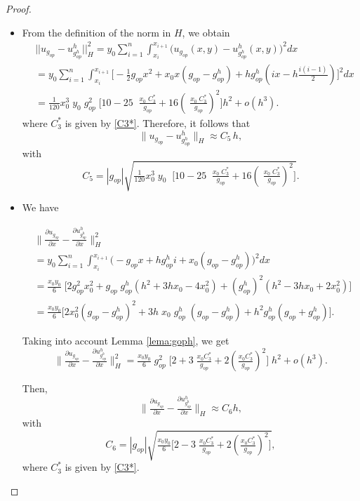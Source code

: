 \documentclass[axioms,article,submit,moreauthors]{Definitions/mdpi}
\newcommand{\dee}{d}
\newcommand{\bint}{\displaystyle\int}
\newcommand\pder[2][]{\ensuremath{\tfrac{\partial#1}{\partial#2}}}
\begin{document}
   \begin{proof}$ $
    \begin{itemize}
     \item[(a)] From the definition of the norm in $H$, we obtain 
      \[\begin{array}{ll}
   &  ||u_{g_{op}}-{u^h_{g^h_{op}}}   ||_{H}^2 =y_0 \displaystyle\sum\limits_{i=1}^n \bint_{x_i}^{x_{i+1}}  \Big(u_{g_{op}}(x,y)-{u^h_{g^h_{op}}}   (x,y)\Big)^2  \dee x\\ 
  & =y_0 \displaystyle\sum\limits_{i=1}^n \bint_{x_i}^{x_{i+1}} \Big[-\tfrac{1}{2} g_{op}x^2+x_0 x (g_{op}-{g^h_{op}})+ h {g^h_{op}}(i x-h\tfrac{i(i-1)}{2})\Big]^2  \dee x\\
  &= \tfrac{1}{120}x_0^3 \;y_0\; g_{op}^2 \;\Big[10-25 \; \;\tfrac{x_0 \; C_3^*}{g_{op}}+16 \left( \;\tfrac{x_0 \; C_3^*}{g_{op}}\right)^2\Big] h^2+ o(h^3).
     \end{array}\]
     where $C_3^*$ is given by \eqref{C3*}.
    Therefore, it follows that 
   \[  \lVert u_{g_{op}}- { u^h_{g^h_{op}}}    \rVert _H \approx C_5\, h,\]
   with \[C_5= |g_{op}| \sqrt{\tfrac{1}{120}x_0^3 \;y_0\;  \;\Big[10-25 \; \;\tfrac{x_0 \; C_3^*}{g_{op}}+16 \left( \;\tfrac{x_0 \; C_3^*}{g_{op}}\right)^2\Big]}.\]
     
     
     \item[(b)] We have
     
     
      $\begin{array}{ll}
    &  \Big\lVert \pder[u_{g_{op}}]{x}-\pder[ {u^h_{g^h_{op}}} ]{x} \Big\rVert  _H^2 \\[0.45cm]
    & =y_0 \displaystyle\sum\limits_{i=1}^n \bint_{x_i}^{x_{i+1}}  \Big(-g_{op}x+h {g^h_{op}}i+x_0(g_{op}-{g^h_{op}})\Big)^2  \dee x\\[0.45cm]
&     =  \tfrac{x_0 y_0}{6} \;\Big[2 g_{op}^2 x_0^2+g_{op}\;{g^h_{op}}(h^2+3hx_0-4x_0^2)+({g^h_{op}})^2(h^2-3hx_0+2x_0^2) \Big]\\[0.45cm]
&=\tfrac{x_0 y_0}{6} \Big[2 x_0^2 (g_{op} -{g^h_{op}})^2 + 
       3 h \;x_0\; {g^h_{op}}  \;(g_{op} - {g^h_{op}}) + h^2 {g^h_{op}}(g_{op} + {g^h_{op}})\Big]. 
        \end{array}$
        
        
        
     \noindent Taking into account Lemma \ref{lema:goph}, we get
     \[ \Big\lVert\pder[ u_{g_{op}}]{x}- \pder[{ u^h_{g^h_{op}}}]{x}    \Big\rVert  _H^2  =  \tfrac{x_0 y_0}{6} \;g_{op}^2\;  \Big[ 2 +3\;\tfrac{x_0 C_3^*}{g_{op}}+2 \left(\tfrac{x_0 C_3^*}{g_{op}}\right)^2 \Big] \; h^2+o(h^3).\]

     \noindent Then, \[ \Big\lVert\pder[ u_{g_{op}}]{x}- \pder[{ u^h_{g^h_{op}}}]{x}    \Big\rVert  _H \approx C_6 h,\] with 
     \[C_6 = |g_{op}|\sqrt{ \tfrac{x_0 y_0}{6}   \Big[ 2 -3\;\tfrac{x_0 C_3^*}{g_{op}}+2 \left(\tfrac{x_0 C_3^*}{g_{op}}\right)^2 \Big] },\]
      where $C_3^*$ is given by \eqref{C3*}. 
    
     
     
     \end{itemize} \end{proof}
\end{document}
